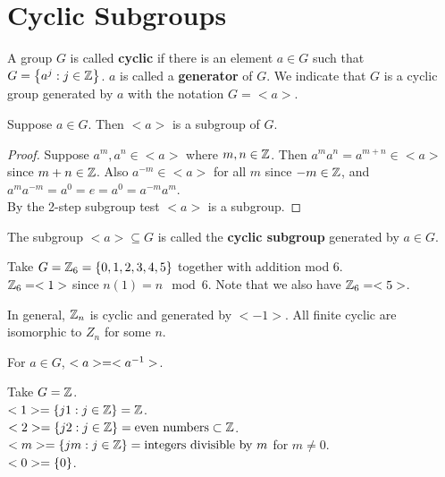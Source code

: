 \chapter{Cyclic Subgroups}


\begin{definition}
    A group $G$ is called \textbf{cyclic} if there is an element $a \in G$ such that $G = \left\{a^j: j \in \mathbb{Z}\right\}$. $a$ is called a \textbf{generator} of $G$. We indicate that $G$ is a cyclic group generated by $a$ with the notation $G = <a>$.
\end{definition}

\begin{theorem}
    Suppose $a \in G$. Then $<a>$ is a subgroup of $G$.
\end{theorem}
\begin{proof}
    Suppose $a^m, a^n \in <a>$ where $m, n \in \mathbb{Z}$. Then $a^ma^n = a^{m + n} \in <a>$ since $m + n \in \mathbb{Z}$. Also $a^{-m} \in <a>$ for all $m$ since $-m \in \mathbb{Z}$, and $a^ma^{-m} = a^0 = e = a^0 = a^{-m}a^m$. \\
    By the 2-step subgroup test $<a>$ is a subgroup.
\end{proof}

\begin{definition}
    The subgroup $<a> \subseteq G$ is called the \textbf{cyclic subgroup} generated by $a \in G$.
\end{definition}

\begin{example}[generators]
    Take $G = \mathbb{Z}_6 = \left\{0,1,2,3,4,5\right\}$ together with addition mod 6. \\
    $\mathbb{Z}_6 = <1>$ since $n(1) = n \mod 6$. Note that we also have $\mathbb{Z}_6 = <5>$.
\end{example}

\begin{remark}
    In general, $\mathbb{Z}_n$ is cyclic and generated by $<-1>$. All finite cyclic are isomorphic to $Z_n$ for some $n$.
\end{remark}

\begin{remark}
    For $a \in G$, $<a> = <a^{-1}>$.
\end{remark}

\begin{example}
    Take $G = \mathbb{Z}$. \\ 
    $<1> = \left\{j1: j \in \mathbb{Z}\right\} = \mathbb{Z}$. \\
    $<2> = \left\{j2: j \in \mathbb{Z}\right\} = \text{even numbers} \subset \mathbb{Z}$. \\
    $<m> = \left\{jm: j \in \mathbb{Z}\right\} = \text{integers divisible by } m$ for $m \neq 0$. \\
    $<0> = \left\{0\right\}$.
\end{example}


